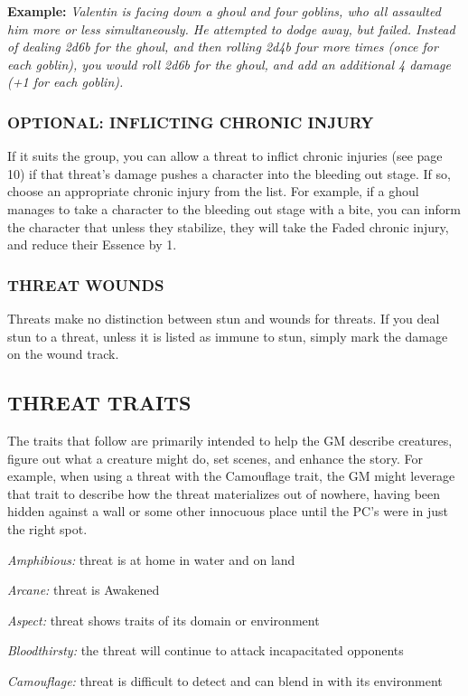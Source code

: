 \documentclass[oneside,10pt]{article}
\begin{document}
\begin{multicols}{2}
\textbf{Example:} \textit{Valentin is facing down a ghoul and four goblins, who all assaulted him more or less simultaneously. He
attempted to dodge away, but failed. Instead of dealing
2d6b for the ghoul, and then rolling 2d4b four more times
(once for each goblin), you would roll 2d6b for the ghoul,
and add an additional 4 damage (+1 for each
goblin).}

\subsubsection{OPTIONAL: INFLICTING CHRONIC INJURY}

If it suits the group, you can allow a threat to inflict chronic injuries (see page 10) if that threat’s damage pushes a character into the bleeding out stage. If so, choose an appropriate
chronic injury from the list. For example, if a ghoul manages
to take a character to the bleeding out stage with a bite, you
can inform the character that unless they stabilize, they will
take the Faded chronic injury, and reduce their Essence by 1.

\subsubsection{THREAT WOUNDS}
Threats make no distinction between stun and wounds for
threats. If you deal stun to a threat, unless it is listed as immune to stun, simply mark the damage on the wound track.

\subsection{THREAT TRAITS}
The traits that follow are primarily intended to help the GM
describe creatures, figure out what a creature might do, set
scenes, and enhance the story. For example, when using a
threat with the Camouflage trait, the GM might leverage that
trait to describe how the threat materializes out of nowhere,
having been hidden against a wall or some other innocuous
place until the PC’s were in just the right spot.

\textit{Amphibious:} threat is at home in water
and on land

\textit{Arcane:} threat is Awakened

\textit{Aspect:} threat shows traits of its domain
or environment

\textit{Bloodthirsty:} the threat will continue to
attack incapacitated opponents

\textit{Camouflage:} threat is difficult to detect and can blend in
with its environment


\end{multicols}
\end{document}
